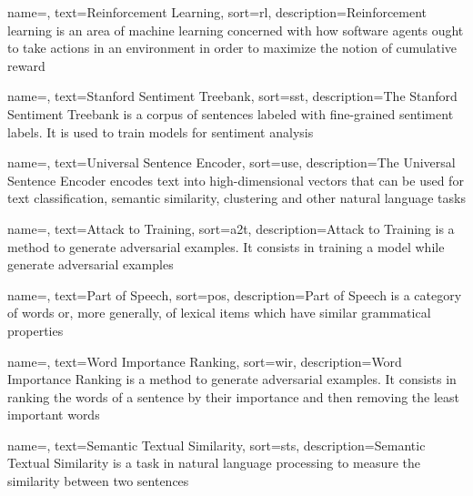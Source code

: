 {
    name=,
    text=Reinforcement Learning,
    sort=rl,
    description={Reinforcement learning is an area of machine learning concerned with how software agents ought to take actions in an environment in order to maximize the notion of cumulative reward}
}


{
    name=,
    text=Stanford Sentiment Treebank,
    sort=sst,
    description={The Stanford Sentiment Treebank is a corpus of sentences labeled with fine-grained sentiment labels. It is used to train models for sentiment analysis}
}

{
    name=,
    text=Universal Sentence Encoder,
    sort=use,
    description={The Universal Sentence Encoder encodes text into high-dimensional vectors that can be used for text classification, semantic similarity, clustering and other natural language tasks}
}

{
    name=,
    text=Attack to Training,
    sort=a2t,
    description={Attack to Training is a method to generate adversarial examples. It consists in training a model while generate adversarial examples}
}

{
    name=,
    text=Part of Speech,
    sort=pos,
    description={Part of Speech is a category of words or, more generally, of lexical items which have similar grammatical properties}
}

{
    name=,
    text=Word Importance Ranking,
    sort=wir,
    description={Word Importance Ranking is a method to generate adversarial examples. It consists in ranking the words of a sentence by their importance and then removing the least important words}
}

{
    name=,
    text=Semantic Textual Similarity,
    sort=sts,
    description={Semantic Textual Similarity is a task in natural language processing to measure the similarity between two sentences}
}

